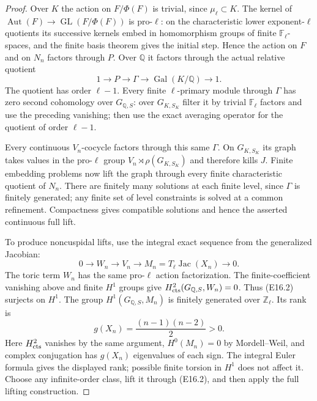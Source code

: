 \begin{proof}
Over $K$ the action on $F/\Phi(F)$ is trivial,
since $\mu_\ell\subset K$. The kernel of
$\operatorname{Aut}(F)\to\operatorname{GL}(F/\Phi(F))$
is pro-$\ell$: on the characteristic lower
exponent-$\ell$ quotients its successive kernels
embed in homomorphism groups of finite
$\mathbb F_\ell$-spaces, and the finite basis
theorem gives the initial step. Hence the
action on $F$ and on $N_n$ factors through $P$.
Over $\mathbb Q$ it factors through the actual
relative quotient
\[
 1\longrightarrow P\longrightarrow\Gamma
 \longrightarrow\operatorname{Gal}(K/\mathbb Q)
 \longrightarrow1 .
\]
The quotient has order $\ell-1$. Every finite
$\ell$-primary module through $\Gamma$ has zero
second cohomology over $G_{\mathbb Q,S}$:
over $G_{K,S_K}$ filter it by trivial
$\mathbb F_\ell$ factors and use the preceding
vanishing; then use the exact averaging
operator for the quotient of order $\ell-1$.

Every continuous $V_n$-cocycle factors through
this same $\Gamma$. On $G_{K,S_K}$ its graph
takes values in the pro-$\ell$ group
$V_n\rtimes\rho(G_{K,S_K})$ and therefore kills
$J$. Finite embedding problems now lift the
graph through every finite characteristic
quotient of $N_n$. There are finitely many
solutions at each finite level, since
$\Gamma$ is finitely generated; any finite
set of level constraints is solved at a
common refinement. Compactness gives
compatible solutions and hence the asserted
continuous full lift.

To produce noncuspidal lifts, use the integral
exact sequence from the generalized Jacobian:
\[
 0\longrightarrow W_n\longrightarrow V_n
 \longrightarrow M_n=T_\ell\operatorname{Jac}(X_n)
 \longrightarrow0 .
 \tag{E16.2}
\]
The toric term $W_n$ has the same pro-$\ell$
action factorization. The finite-coefficient
vanishing above and finite $H^1$ groups give
$H^2_{\rm cts}(G_{\mathbb Q,S},W_n)=0$.
Thus (E16.2) surjects on $H^1$.
The group $H^1(G_{\mathbb Q,S},M_n)$ is finitely
generated over $\mathbb Z_\ell$. Its rank is
\[
 g(X_n)=\frac{(n-1)(n-2)}2>0 .
\]
Here $H^2_{\rm cts}$ vanishes by the same argument,
$H^0(M_n)=0$ by Mordell--Weil, and complex
conjugation has $g(X_n)$ eigenvalues of each
sign. The integral Euler formula gives the
displayed rank; possible finite torsion in
$H^1$ does not affect it. Choose any infinite-order
class, lift it through (E16.2), and then apply
the full lifting construction.


\end{proof}
